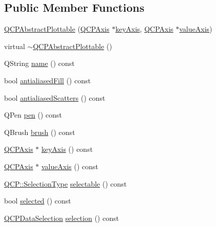 \subsection*{Public Member Functions}
\begin{DoxyCompactItemize}
\item 
\mbox{\hyperlink{class_q_c_p_abstract_plottable_af78a036e40db6f53a31abadc5323715a}{Q\+C\+P\+Abstract\+Plottable}} (\mbox{\hyperlink{class_q_c_p_axis}{Q\+C\+P\+Axis}} $\ast$\mbox{\hyperlink{class_q_c_p_abstract_plottable_a2cdd6f0dd5e9a979037f86b4000d9cfe}{key\+Axis}}, \mbox{\hyperlink{class_q_c_p_axis}{Q\+C\+P\+Axis}} $\ast$\mbox{\hyperlink{class_q_c_p_abstract_plottable_af47809a644a68ffd955fb30b01fb4f2f}{value\+Axis}})
\item 
virtual \mbox{\hyperlink{class_q_c_p_abstract_plottable_a88112bcbe9eb995b1190ad7591f2d0b5}{$\sim$\+Q\+C\+P\+Abstract\+Plottable}} ()
\item 
Q\+String \mbox{\hyperlink{class_q_c_p_abstract_plottable_a52c226eefcb1920240eeabae574d28c0}{name}} () const
\item 
bool \mbox{\hyperlink{class_q_c_p_abstract_plottable_a022717896dc57b638a7b5a7be7212ba9}{antialiased\+Fill}} () const
\item 
bool \mbox{\hyperlink{class_q_c_p_abstract_plottable_a795370db6b1309de0ab60b633efb5ec2}{antialiased\+Scatters}} () const
\item 
Q\+Pen \mbox{\hyperlink{class_q_c_p_abstract_plottable_ad5972efc31344e5a7a78ab4f8864b2d3}{pen}} () const
\item 
Q\+Brush \mbox{\hyperlink{class_q_c_p_abstract_plottable_a893b4896dfd92b68b05b2600b80f5826}{brush}} () const
\item 
\mbox{\hyperlink{class_q_c_p_axis}{Q\+C\+P\+Axis}} $\ast$ \mbox{\hyperlink{class_q_c_p_abstract_plottable_a2cdd6f0dd5e9a979037f86b4000d9cfe}{key\+Axis}} () const
\item 
\mbox{\hyperlink{class_q_c_p_axis}{Q\+C\+P\+Axis}} $\ast$ \mbox{\hyperlink{class_q_c_p_abstract_plottable_af47809a644a68ffd955fb30b01fb4f2f}{value\+Axis}} () const
\item 
\mbox{\hyperlink{namespace_q_c_p_ac6cb9db26a564b27feda362a438db038}{Q\+C\+P\+::\+Selection\+Type}} \mbox{\hyperlink{class_q_c_p_abstract_plottable_a016653741033bd332d1d4c3c725cc284}{selectable}} () const
\item 
bool \mbox{\hyperlink{class_q_c_p_abstract_plottable_a0b3b514474fe93354fc74cfc144184b4}{selected}} () const
\item 
\mbox{\hyperlink{class_q_c_p_data_selection}{Q\+C\+P\+Data\+Selection}} \mbox{\hyperlink{class_q_c_p_abstract_plottable_a040bf09f41d456284cfd39cc37aa068f}{selection}} () const

\end{DoxyCompactItemize}
